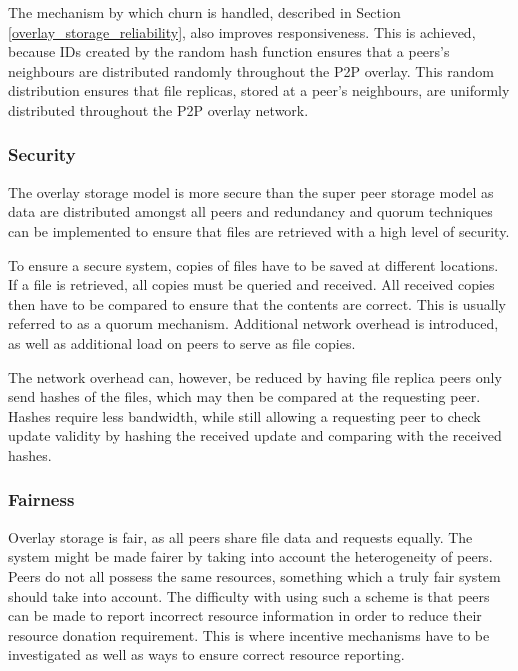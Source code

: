 The mechanism by which churn is handled, described in Section \ref{overlay_storage_reliability}, also improves responsiveness.  This is achieved, because IDs created by the random hash function ensures that a peers's neighbours are distributed randomly throughout the P2P overlay. This random distribution ensures that file replicas, stored at a peer's neighbours, are uniformly distributed throughout the P2P overlay network.


\subsubsection{Security}
The overlay storage model is more secure than the super peer storage model as data are distributed amongst all peers and redundancy and quorum techniques can be implemented to ensure that files are retrieved with a high level of security.

To ensure a secure system, copies of files have to be saved at different locations. If a file is retrieved, all copies must be queried and received. All received copies then have to be compared to ensure that the contents are correct. This is usually referred to as a quorum mechanism.  Additional network overhead is introduced, as well as additional load on peers to serve as file copies.

The network overhead can, however, be reduced by having file replica peers only send hashes of the files, which may then be compared at the requesting peer. Hashes require less bandwidth, while still allowing a requesting peer to check update validity by hashing the received update and comparing with the received hashes.

\subsubsection{Fairness}

Overlay storage is fair, as all peers share file data and requests equally. The system might be made fairer by taking into account the heterogeneity of peers. Peers do not all possess the same resources, something which a truly fair system should take into account. The difficulty with using such a scheme is that peers can be made to report incorrect resource information in order to reduce their resource donation requirement. This is where incentive mechanisms have to be investigated as well as ways to ensure correct resource reporting.

